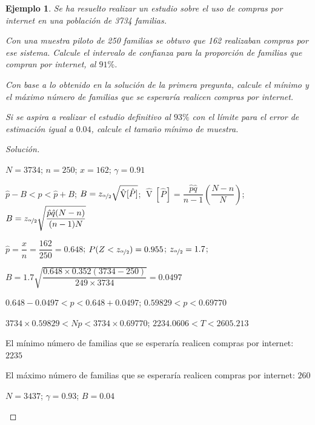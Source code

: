 \documentclass[a5paper,doc,10pt,noapacite]{apa6}
\DeclareMathOperator{\Var}{V}
\newtheorem{ejem}{Ejemplo}
\begin{document}
{{\begin{ejem}
	Se ha resuelto realizar un estudio sobre el uso de compras por internet en una población de 3734 familias.
	\begin{APAenumerate}
		\item Con una muestra piloto de 250 familias se obtuvo que 162 realizaban compras por ese sistema. Calcule el intervalo de confianza para la proporción de familias que compran por internet, al \(91\%\).
		\item Con base a lo obtenido en la solución de la primera pregunta, calcule el mínimo y el máximo número de familias que se esperaría realicen compras por internet.  
		\item Si se aspira a realizar el estudio definitivo al \(93\%\) con el límite para el error de estimación igual a \(0.04\), calcule el tamaño mínimo de muestra.
	\end{APAenumerate}
\end{ejem}
\begin{proof}[Solución]\quad
	\begin{APAenumerate}
		\item \(N=3734\); \(n=250\); \(x=162\); \(\gamma=0.91\)
		
		\(\hat{p}-B<p<\hat{p}+B\); \(B=z_{\nicefrac{\alpha}{2}}\sqrt{\hat{\Var}[\hat{P}]}\); \(\hat{\Var}[\hat{P}]=\dfrac{\hat{p}\hat{q}}{n-1}\left(\dfrac{N-n}{N}\right)\); \(B=z_{\nicefrac{\alpha}{2}}\sqrt{\dfrac{\hat{p}\hat{q}(N-n)}{(n-1)N}}\)
		
		\(\hat{p}=\dfrac{x}{n}=\dfrac{162}{250}=0.648\); \(P(Z<z_{\nicefrac{\alpha}{2}})=0.955\); \(z_{\nicefrac{\alpha}{2}}=1.7\);
		
		\(B=1.7\sqrt{\dfrac{0.648 \times 0.352(3734-250)}{249 \times 3734}}=0.0497\)
		
		\(0.648-0.0497<p<0.648+0.0497\); \(0.59829<p<0.69770\)
		
		\vspace{1\baselineskip}
		\item \(3734 \times 0.59829<Np<3734 \times 0.69770\); \(2234.0606<T<2605.213\)
		
		El mínimo número de familias que se esperaría realicen compras por internet: \(2235\)
		
		El máximo número de familias que se esperaría realicen compras por internet: \(260\)
		
		\vspace{1\baselineskip}
		\item \(N=3437\); \(\gamma=0.93\); \(B=0.04\)
		

\end{APAenumerate}
\end{proof}}}
\end{document}
